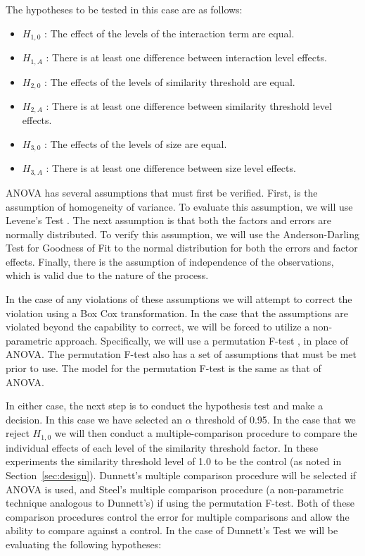 \documentclass[conference]{IEEEtran}
\providecommand{\tightlist}{%
  \setlength{\itemsep}{0pt}\setlength{\parskip}{0pt}}
\begin{document}
\noindent The hypotheses to be tested in this case are as follows:

\begin{itemize}
\tightlist
\item
  \(H_{1,0}\) : The effect of the levels of the interaction term are
  equal.
\item
  \(H_{1,A}\) : There is at least one difference between interaction
  level effects.
\item
  \(H_{2,0}\) : The effects of the levels of similarity threshold are
  equal.
\item
  \(H_{2,A}\) : There is at least one difference between similarity
  threshold level effects.
\item
  \(H_{3,0}\) : The effects of the levels of size are equal.
\item
  \(H_{3,A}\) : There is at least one difference between size level
  effects.
\end{itemize}

ANOVA has several assumptions that must first be verified. First, is the
assumption of homogeneity of variance. To evaluate this assumption, we
will use Levene's Test \cite{leveneRobustTestsEquality1960}. The next
assumption is that both the factors and errors are normally distributed.
To verify this assumption, we will use the Anderson-Darling Test for
Goodness of Fit \cite{andersonTestGoodnessFit1954} to the normal
distribution for both the errors and factor effects. Finally, there is
the assumption of independence of the observations, which is valid due
to the nature of the process.

In the case of any violations of these assumptions we will attempt to
correct the violation using a Box Cox transformation. In the case that
the assumptions are violated beyond the capability to correct, we will
be forced to utilize a non-parametric approach. Specifically, we will
use a permutation F-test
\cite{higginsIntroductionModernNonparametric2004}, in place of ANOVA.
The permutation F-test also has a set of assumptions that must be met
prior to use. The model for the permutation F-test is the same as that
of ANOVA.

In either case, the next step is to conduct the hypothesis test and make
a decision. In this case we have selected an \(\alpha\) threshold of
0.95. In the case that we reject \(H_{1,0}\) we will then conduct a
multiple-comparison procedure to compare the individual effects of each
level of the similarity threshold factor. In these experiments the
similarity threshold level of 1.0 to be the control (as noted in
Section~\ref{sec:design}). Dunnett's
\cite{dunnettMultipleComparisonProcedure1955} multiple comparison
procedure will be selected if ANOVA is used, and Steel's
\cite{steelMultipleComparisonSign1959} multiple comparison procedure (a
non-parametric technique analogous to Dunnett's) if using the
permutation F-test. Both of these comparison procedures control the
error for multiple comparisons and allow the ability to compare against
a control. In the case of Dunnett's Test we will be evaluating the
following hypotheses:
\end{document}
